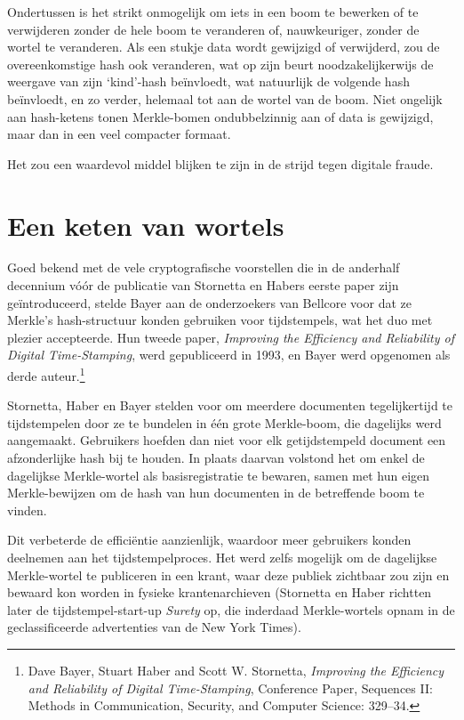 \documentclass[
  a5paper,
  smalldemyvopaper,11pt,twoside,onecolumn,openright,extrafontsizes,
hidelinks]{memoir}
\begin{document}
Ondertussen is het strikt onmogelijk om iets in een boom te bewerken of
te verwijderen zonder de hele boom te veranderen of, nauwkeuriger,
zonder de wortel te veranderen. Als een stukje data wordt gewijzigd of
verwijderd, zou de overeenkomstige hash ook veranderen, wat op zijn
beurt noodzakelijkerwijs de weergave van zijn `kind'-hash beïnvloedt,
wat natuurlijk de volgende hash beïnvloedt, en zo verder, helemaal tot
aan de wortel van de boom. Niet ongelijk aan hash-ketens tonen
Merkle-bomen ondubbelzinnig aan of data is gewijzigd, maar dan in een
veel compacter formaat.

Het zou een waardevol middel blijken te zijn in de strijd tegen digitale
fraude.

\section{Een keten van wortels}\label{een-keten-van-wortels}

Goed bekend met de vele cryptografische voorstellen die in de anderhalf
decennium vóór de publicatie van Stornetta en Habers eerste paper zijn
geïntroduceerd, stelde Bayer aan de onderzoekers van Bellcore voor dat
ze Merkle's hash-structuur konden gebruiken voor tijdstempels, wat het
duo met plezier accepteerde. Hun tweede paper, \emph{Improving the
Efficiency and Reliability of Digital Time-Stamping}, werd gepubliceerd
in 1993, en Bayer werd opgenomen als derde auteur.\footnote{Dave Bayer,
  Stuart Haber and Scott W. Stornetta, \emph{Improving the Efficiency
  and Reliability of Digital Time-Stamping}, Conference Paper, Sequences
  II: Methods in Communication, Security, and Computer Science: 329--34.}

Stornetta, Haber en Bayer stelden voor om meerdere documenten
tegelijkertijd te tijdstempelen door ze te bundelen in één grote
Merkle-boom, die dagelijks werd aangemaakt. Gebruikers hoefden dan niet
voor elk getijdstempeld document een afzonderlijke hash bij te houden.
In plaats daarvan volstond het om enkel de dagelijkse Merkle-wortel als
basisregistratie te bewaren, samen met hun eigen Merkle-bewijzen om de
hash van hun documenten in de betreffende boom te vinden.

Dit verbeterde de efficiëntie aanzienlijk, waardoor meer gebruikers
konden deelnemen aan het tijdstempelproces. Het werd zelfs mogelijk om
de dagelijkse Merkle-wortel te publiceren in een krant, waar deze
publiek zichtbaar zou zijn en bewaard kon worden in fysieke
krantenarchieven (Stornetta en Haber richtten later de
tijdstempel-start-up \emph{Surety} op, die inderdaad Merkle-wortels
opnam in de geclassificeerde advertenties van de New York Times).
\end{document}
